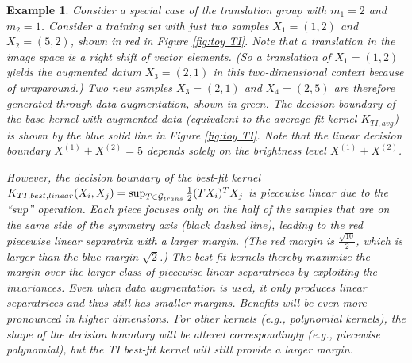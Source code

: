 \documentclass{article}
\theoremstyle{plain}
\newtheorem{example}{Example}
\theoremstyle{definition}
\theoremstyle{remark}
\begin{document}
\begin{example} \label{example}
Consider a special case of the translation group with $m_1 = 2$ and $m_2 = 1$. Consider a training set with just two samples $X_1 = (1, 2)$ and $ X_2 = (5, 2)$, shown in red in Figure \ref{fig:toy TI}. Note that a translation in the \emph{image space} is a right shift of vector elements. (So a translation of $X_1 = (1, 2)$ yields the augmented datum $X_3= (2, 1)$ in this two-dimensional context because of wraparound.) Two new samples $X_3 = (2, 1)$ and $X_4 = (2, 5)$ are therefore generated through data augmentation, shown in green. The decision boundary of the base kernel with augmented data (equivalent to the average-fit kernel $K_{TI, avg}$) is shown by the blue solid line in Figure \ref{fig:toy TI}. Note that the linear decision boundary $X^{(1)}+X^{(2)}=5$ depends solely on the brightness level $X^{(1)}+X^{(2)}$.%

However, the decision boundary of the best-fit kernel $K_{TI,best,linear}(X_i, X_j) = \sup_{T \in {\cal{G}}_{trans}} \frac{1}{2} (T X_i)^T X_j$ is \emph{piecewise linear} due to the ``sup'' operation. Each piece focuses only on the half of the samples that are on the same side of the symmetry axis (black dashed line), leading to the red piecewise linear separatrix with a larger margin. (The red margin is $\frac{\sqrt{10}}{2}$, which is larger than the blue margin $\sqrt{2}$.) The best-fit kernels thereby maximize the margin over the larger class of piecewise linear separatrices by exploiting the invariances. Even when data augmentation is used, it only produces linear separatrices and thus still has smaller margins. Benefits will be even more pronounced in higher dimensions. For other kernels (e.g., polynomial kernels), the shape of the decision boundary will be altered correspondingly (e.g., piecewise polynomial), but the TI best-fit kernel will still provide a larger margin.
\end{example}
\end{document}
